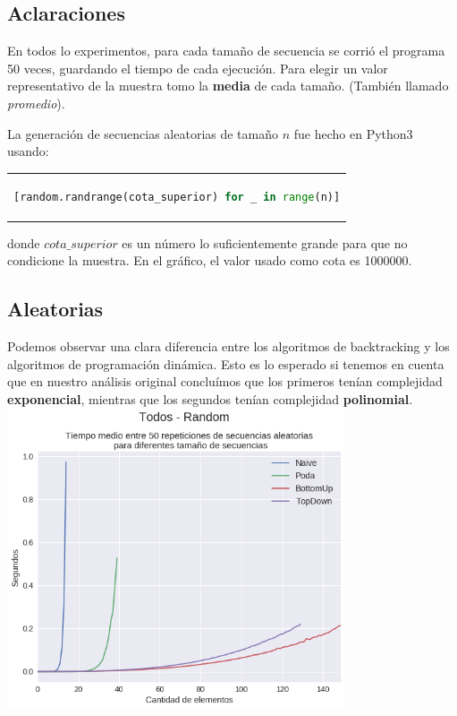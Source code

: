 \subsection{Aclaraciones}
En todos lo experimentos, para cada tamaño de secuencia se corrió el programa 50 veces, guardando el tiempo de cada ejecución. Para elegir un valor representativo de la muestra tomo la \textbf{media} de cada tamaño. (También llamado \textit{promedio}).

La generación de secuencias aleatorias de tamaño $n$ fue hecho en Python3 usando: 
\begin{center}
\begin{tabular}{c}
\begin{lstlisting}[language=Python]
[random.randrange(cota_superior) for _ in range(n)]
\end{lstlisting}
\end{tabular}
\end{center}

donde $cota\_superior$ es un número lo suficientemente grande para que no condicione la muestra. En el gráfico, el valor usado como cota es 1000000.

\subsection{Aleatorias}

Podemos observar una clara diferencia entre los algoritmos de backtracking y los algoritmos de programación dinámica. Esto es lo esperado si tenemos en cuenta que en nuestro análisis original concluímos que los primeros tenían complejidad \textbf{exponencial}, mientras que los segundos tenían complejidad \textbf{polinomial}. \\

{\centering
  \includegraphics[width=0.75\textwidth]{informe/img/experimentos/todos-random.png} \\
} 

